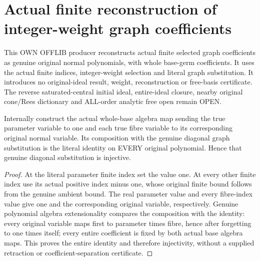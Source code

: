 \section{Actual finite reconstruction of integer-weight graph coefficients}
This OWN OFFLIB producer reconstructs actual finite selected graph coefficients as genuine original normal polynomials, with whole base-germ coefficients. It uses the actual finite indices, integer-weight selection and literal graph substitution. It introduces no original-ideal result, weight, reconstruction or free-basis certificate. The reverse saturated-central initial ideal, entire-ideal closure, nearby original cone/Rees dictionary and ALL-order analytic free open remain OPEN.

\begin{lemma}
\label{hir:relative-normal-graph-weight-actual-forgetting}
\leanok
Internally construct the actual whole-base algebra map sending the true parameter variable to one and each true fibre variable to its corresponding original normal variable. Its composition with the genuine diagonal graph substitution is the literal identity on EVERY original polynomial. Hence that genuine diagonal substitution is injective.
\end{lemma}
\begin{proof}
At the literal parameter finite index set the value one. At every other finite index use its actual positive index minus one, whose original finite bound follows from the genuine ambient bound. The real parameter value and every fibre-index value give one and the corresponding original variable, respectively. Genuine polynomial algebra extensionality compares the composition with the identity: every original variable maps first to parameter times fibre, hence after forgetting to one times itself; every entire coefficient is fixed by both actual base algebra maps. This proves the entire identity and therefore injectivity, without a supplied retraction or coefficient-separation certificate.
\end{proof}

